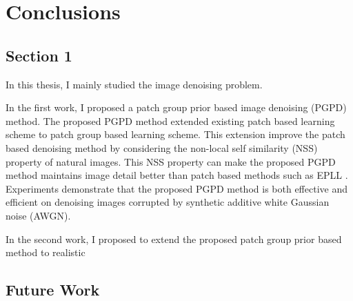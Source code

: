 %
\chapter{Conclusions}
\label{sec:conclusions}


\section{Section 1}
\label{sec:conclusions:sec1}
In this thesis, I mainly studied the image denoising problem. 

In the first work, I proposed a patch group prior based image denoising (PGPD) method. The proposed PGPD method extended existing patch based learning scheme to patch group based learning scheme. This extension improve the patch based denoising method by considering the non-local self similarity (NSS) property of natural images. This NSS property can make the proposed PGPD method maintains image detail better than patch based methods such as EPLL \cite{epll}. Experiments demonstrate that the proposed PGPD method is both effective and efficient on denoising images corrupted by synthetic additive white Gaussian noise (AWGN).

In the second work, I proposed to extend the proposed patch group prior based method to realistic 



\section{Future Work}
\label{sec:conclusions:future}


